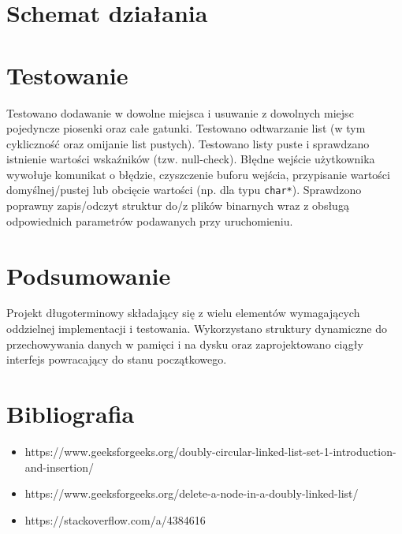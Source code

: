 \documentclass[a4paper, 12pt]{article}
\begin{document}
\section*{Schemat działania}
\begin{center}
\end{center}

\section*{Testowanie}
Testowano dodawanie w dowolne miejsca i usuwanie z dowolnych miejsc pojedyncze piosenki oraz całe gatunki. Testowano odtwarzanie list (w tym cykliczność oraz omijanie list pustych). Testowano listy puste i sprawdzano istnienie wartości wskaźników (tzw. null-check). Błędne wejście użytkownika wywołuje komunikat o błędzie, czyszczenie buforu wejścia, przypisanie wartości domyślnej/pustej lub obcięcie wartości (np. dla typu \texttt{char*}). Sprawdzono poprawny zapis/odczyt struktur do/z plików binarnych wraz z obsługą odpowiednich parametrów podawanych przy uruchomieniu.

\section*{Podsumowanie}
Projekt długoterminowy składający się z wielu elementów wymagających oddzielnej implementacji i testowania. Wykorzystano struktury dynamiczne do przechowywania danych w pamięci i na dysku oraz zaprojektowano ciągły interfejs powracający do stanu początkowego.

\section*{Bibliografia}
\begin{itemize}
    \item https://www.geeksforgeeks.org/doubly-circular-linked-list-set-1-introduction-and-insertion/
    \item https://www.geeksforgeeks.org/delete-a-node-in-a-doubly-linked-list/
    \item https://stackoverflow.com/a/4384616
\end{itemize}
\end{document}
